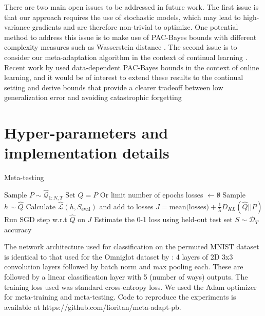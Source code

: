 \documentclass[letterpaper]{article} %
\theoremstyle{definition}
\begin{document}
There are two main open issues to be addressed in future work. 
The first issue is that our approach requires the use of stochastic models, which may lead to high-variance gradients and are therefore non-trivial to optimize. One potential method to address this issue is to make use of PAC-Bayes bounds with different complexity measures such as Wasserstein distance \citep{Ohnishi2021, Amit2022}.
The second issue is to consider our meta-adaptation algorithm in the context of continual learning \citep{Kirkpatrick2017}. Recent work by \citet{Haddouche2022} used data-dependent PAC-Bayes bounds in the context of online learning, and it would be of interest to extend these results to the continual setting and derive bounds that provide a clearer tradeoff between low generalization error and avoiding catastrophic forgetting




\clearpage
\appendix
\section{Hyper-parameters and implementation details} \label{append:hyper-params}

\begin{algorithm}[H]
	\caption{Meta-testing}
	\small
	\begin{algorithmic}
		\State Sample $P\sim \hat{\mathcal{Q}}_{1:N, T}$
		\State Set $\hat{Q}=P$
		 \Comment Or limit number of epochs
			\State losses $\leftarrow \emptyset$
				\State Sample $h\sim \hat{Q}$
				\State Calculate $\hat{\mathcal{L}}(h,S_{\mathrm{eval}})$ and add to losses
			\EndFor
			\State $J=\textrm{mean(losses)}+\frac{1}{\lambda} D_{KL}(\hat{Q}||P)$
			\State Run SGD step w.r.t $\hat{Q}$ on $J$
		\EndWhile
		\State Estimate the 0-1 loss using held-out test set $S\sim \mathcal{D}_T$
		\State \Return accuracy
		\EndFunction
	\end{algorithmic}
\end{algorithm}

The network architecture used for classification on the permuted MNIST dataset is identical to that used for the Omniglot dataset by \citet{Vinyals2016}: 4 layers of 2D 3x3 convolution layers followed by batch norm and max pooling each. These are followed by a linear classification layer with 5 (number of ways) outputs. The training loss used was standard cross-entropy loss. We used the Adam optimizer for meta-training and meta-testing. Code to reproduce the experiments is available at https://github.com/lioritan/meta-adapt-pb.
\end{document}
